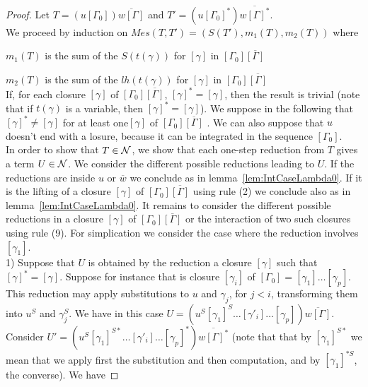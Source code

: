 \documentclass{llncs} %
\begin{document}
\begin{proof}

  Let $T = (u[\Gamma_0])\overline{w[\Gamma]}$ and $T' = (u[\Gamma_0]^*)\overline{w[\Gamma]^*}$.
\\
We proceed by induction on $Mes(T,T') = (S(T'), m_1(T), m_2(T))$ where

 $m_1(T)$ is the sum of the $S(t(\gamma))$ for  $[\gamma]$ in $[\Gamma_0]\overline{[\Gamma]}$

 $m_2(T)$ is the sum of the $lh(t(\gamma))$ for $[\gamma]$ in $[\Gamma_0]\overline{[\Gamma]}$
 \\
If,  for each closure $[\gamma]$ of $[\Gamma_0]\overline{[\Gamma]}$,  $[\gamma]^* = [\gamma]$, then the result is trivial (note that if $t(\gamma)$ is a variable, then  $[\gamma]^* = [\gamma]$). We suppose in the following that $[\gamma]^* \neq [\gamma]$ for at least one$[\gamma]$ of $[\Gamma_0]\overline{[\Gamma]}$ . We can also suppose that $u$ doesn't end with a losure, because it can be integrated in the sequence $[\Gamma_0]$.
\\
In order to show that $T\in\mathcal{N}$, we show that each one-step reduction from $T$ gives a term $U\in\mathcal{N}$. We consider the different possible reductions leading to $U$. If the reductions are inside $u$ or $\overline{w}$ we conclude as in lemma~\ref{lem:IntCaseLambda0}. If it is the lifting of a closure $[\gamma]$ of $[\Gamma_0]\overline{[\Gamma]}$ using rule (2) we conclude also as in lemma~\ref{lem:IntCaseLambda0}. It remains to consider the different possible reductions in a closure $[\gamma]$ of $[\Gamma_0]\overline{[\Gamma]}$ or the interaction of two such closures using rule (9). For simplication we consider the case where the reduction involves $[\gamma_1]$.
%
%
\medskip
\\
1) Suppose that $U$ is obtained by the reduction a closure $[\gamma]$ such that  $[\gamma]^* = [\gamma]$. Suppose for instance that is closure $[\gamma_i]$ of $[\Gamma_0] = [\gamma_1] \dots[\gamma_p]$. This reduction  may apply substitutions to $u$ and $\gamma_j$, for $j<i$, transforming them into $u^S$ and $\gamma_j^S$. We have in this case $U = (u^S[\gamma_1]^S \dots [\gamma'_i]\dots [\gamma_p])\overline{w[\Gamma]}$.
\\
Consider $U' = (u^S[\gamma_1]^{S*} \dots [\gamma'_i]\dots [\gamma_p]^*)\overline{w[\Gamma]^*}$ (note that that by $[\gamma_1]^{S*}$ we mean that we apply first the substitution and then computation, and by $[\gamma_1]^{*S}$, the converse).  We have


\end{proof}
\end{document}
